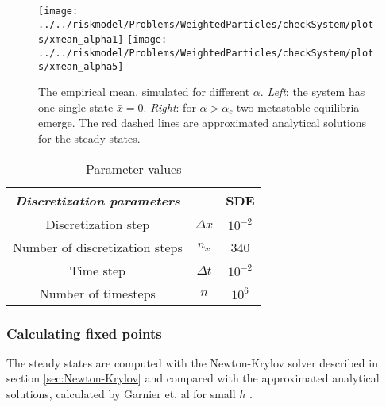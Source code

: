 \begin{center}
\begin{figure}
\texttt{[image: ../../riskmodel/Problems/WeightedParticles/checkSystem/plots/xmean\_alpha1]}
\texttt{[image: ../../riskmodel/Problems/WeightedParticles/checkSystem/plots/xmean\_alpha5]}

\caption{The empirical mean, simulated for different $\alpha$. \textit{Left}: the system has one single state $\bar{x}=0$. \textit{Right}: for $\alpha> \alpha_c$ two metastable equilibria emerge. 
 The red dashed lines are approximated  analytical solutions for the steady states. \label{fig:sysrisk}}
\end{figure}
\end{center}


 \begin{center}
\begin{table}
\caption{Parameter values}
  \begin{tabular} { | c  c | c |}    \hline   
   \textit{ {Discretization parameters}}&    &  SDE    \\ \hline
    Discretization step  & $\Delta x $  & $10^{-2}$ \\ 
        Number of discretization steps  & $n_x$ &  340 \\ 
    Time step  &  $\Delta t$ &   $10^{-2}$ \\ 
       Number of timesteps  & $n$  &  $10^{6}$ \\ \hline
  \end{tabular}
\end{table}
\end{center}



\subsubsection{Calculating fixed points}
The steady  states are computed with the Newton-Krylov solver described in section \ref{sec:Newton-Krylov} and compared with the approximated analytical solutions, calculated by Garnier et. al for small $h$ \cite{Garnier}.


